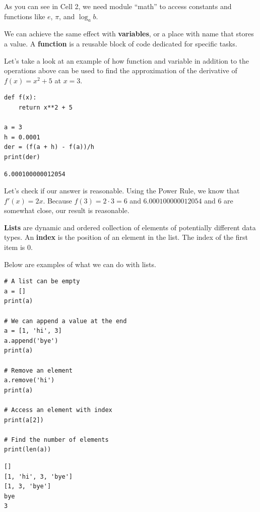 \documentclass[../../../main.tex]{subfiles}
\begin{document}
As you can see in Cell 2, we need module ``math'' to access
constants and functions like $e$, $\pi$, and $\log_a b$.

\begin{definition}{}{}
We can achieve the same effect with \textbf{variables}, or
a place with name that stores a value. A \textbf{function}
is a reusable block of code dedicated for specific tasks.
\end{definition}

Let's take a look at an example of how function and variable
in addition to the operations above can be used to find
the approximation of the derivative of $f(x) = x^2 + 5$
at $x = 3$.

\begin{jupyter}
\begin{lstlisting}[style=jin]
def f(x):
    return x**2 + 5

a = 3
h = 0.0001
der = (f(a + h) - f(a))/h
print(der)
\end{lstlisting}

\begin{lstlisting}[style=jout]
6.000100000012054
\end{lstlisting}
\end{jupyter}

Let's check if our answer is reasonable. Using the Power Rule,
we know that $f'(x) = 2x$. Because $f(3) = 2 \cdot 3 = 6$
and $6.000100000012054$ and $6$ are somewhat close, our result
is reasonable.

\begin{definition}{}{}
\textbf{Lists} are dynamic and ordered collection of elements
of potentially different data types. An \textbf{index} is the
position of an element in the list. The index of the first item
is $0$.
\end{definition}

Below are examples of what we can do with lists.

\begin{jupyter}
\begin{lstlisting}[style=jin]
# A list can be empty
a = []
print(a)

# We can append a value at the end
a = [1, 'hi', 3]
a.append('bye')
print(a)

# Remove an element
a.remove('hi')
print(a)

# Access an element with index
print(a[2])

# Find the number of elements
print(len(a))
\end{lstlisting}

\begin{lstlisting}[style=jout]
[]
[1, 'hi', 3, 'bye']
[1, 3, 'bye']
bye
3
\end{lstlisting}
\end{jupyter}
\end{document}
